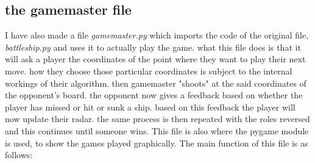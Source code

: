 \documentclass{article}
\begin{document}
	
	\subsection{the gamemaster file} 
	
	I have also made a file \textit{gamemaster.py} which imports the code of the original file, \textit{battleship.py} and uses it to actually play the game. what this file does is that it will ask a player the coordinates of the point where they want to play their next move. how they choose those particular coordinates is subject to the internal workings of their algorithm. then gamemaster "shoots" at the said coordinates of the opponent's board. the opponent now gives a feedback based on whether the player has missed or hit or sunk a ship. based on this feedback the player will now update their radar. the same process is then repeated with the roles reversed and this continues until someone wins. This file is also where the pygame module is used, to show the games played graphically. The main function of this file is as follows: 
\end{document}
